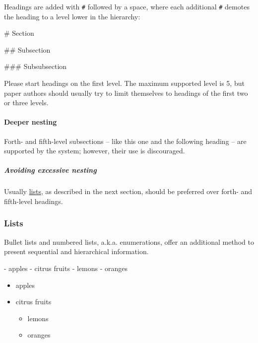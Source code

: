 \documentclass[
]{article}
\newenvironment{Shaded}{}{}
\newcommand{\FunctionTok}[1]{\textcolor[rgb]{0.02,0.16,0.49}{#1}}
\newcommand{\NormalTok}[1]{#1}
\newcommand{\SpecialStringTok}[1]{\textcolor[rgb]{0.73,0.40,0.53}{#1}}
\providecommand{\tightlist}{%
  \setlength{\itemsep}{0pt}\setlength{\parskip}{0pt}}
\begin{document}
Headings are added with \texttt{\#} followed by a space, where each
additional \texttt{\#} demotes the heading to a level lower in the
hierarchy:

\begin{Shaded}
\begin{Highlighting}[]
\FunctionTok{\# Section}

\FunctionTok{\#\# Subsection}

\FunctionTok{\#\#\# Subsubsection}
\end{Highlighting}
\end{Shaded}

Please start headings on the first level. The maximum supported level is
5, but paper authors should usually try to limit themselves to headings
of the first two or three levels.

\hypertarget{deeper-nesting}{%
\paragraph{Deeper nesting}\label{deeper-nesting}}

Forth- and fifth-level subsections -- like this one and the following
heading -- are supported by the system; however, their use is
discouraged.

\hypertarget{avoiding-excessive-nesting}{%
\subparagraph{Avoiding excessive
nesting}\label{avoiding-excessive-nesting}}

Usually \protect\hyperlink{lists}{lists}, as described in the next
section, should be preferred over forth- and fifth-level headings.

\hypertarget{lists}{%
\subsubsection{Lists}\label{lists}}

Bullet lists and numbered lists, a.k.a. enumerations, offer an
additional method to present sequential and hierarchical information.

\begin{Shaded}
\begin{Highlighting}[]
\SpecialStringTok{{-} }\NormalTok{apples}
\SpecialStringTok{{-} }\NormalTok{citrus fruits}
\SpecialStringTok{  {-} }\NormalTok{lemons}
\SpecialStringTok{  {-} }\NormalTok{oranges}
\end{Highlighting}
\end{Shaded}

\begin{itemize}
\tightlist
\item
  apples
\item
  citrus fruits

  \begin{itemize}
  \tightlist
  \item
    lemons
  \item
    oranges
  \end{itemize}
\end{itemize}
\end{document}
